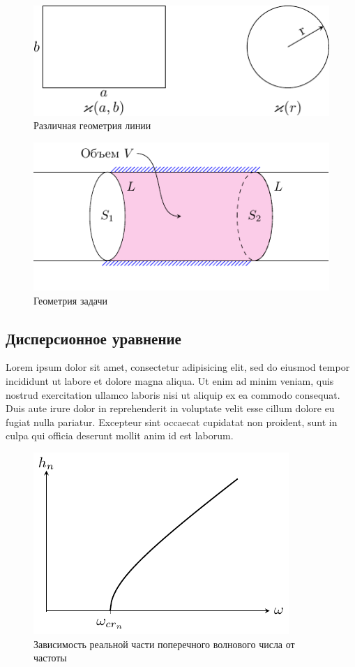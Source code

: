 \begin{figure}[H]
	\centering
	\includegraphics[scale=1.5]{img/lect2_ris4}
	\caption{Различная геометрия линии}
	\label{fig:wavegain:4}
\end{figure}

\begin{figure}[H]
	\centering
	\includegraphics[scale=1.5]{img/lect2_ris5}
	\caption{Геометрия задачи}
	\label{fig:wavegain:5}
\end{figure}



\subsection{Дисперсионное уравнение}
Lorem ipsum dolor sit amet, consectetur adipisicing elit, sed do eiusmod
tempor incididunt ut labore et dolore magna aliqua. Ut enim ad minim veniam,
quis nostrud exercitation ullamco laboris nisi ut aliquip ex ea commodo
consequat. Duis aute irure dolor in reprehenderit in voluptate velit esse
cillum dolore eu fugiat nulla pariatur. Excepteur sint occaecat cupidatat non
proident, sunt in culpa qui officia deserunt mollit anim id est laborum.
\begin{figure}[H]
	\centering
	\includegraphics[scale=1.6]{img/lect2_ris6}
	\caption{Зависимость реальной части поперечного волнового числа от частоты}
	\label{fig:wavegain:5}
\end{figure}